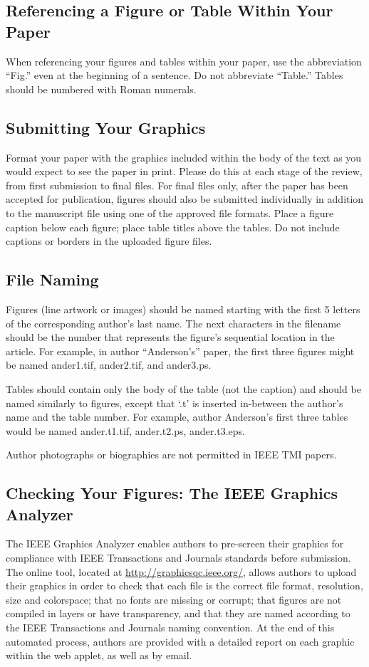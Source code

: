 \documentclass[journal,twoside,web]{ieeecolor}
\begin{document}
\subsection{Referencing a Figure or Table Within Your Paper}
When referencing your figures and tables within your paper, use the
abbreviation ``Fig.'' even at the beginning of a sentence. Do not abbreviate
``Table.'' Tables should be numbered with Roman numerals.

\subsection{Submitting Your Graphics}
Format your paper with the graphics included within the body of the text
as you would expect to see the paper in print. Please do this at each stage of the review,
from first submission to final files. For final files only, after the paper has been accepted
for publication, figures should also be submitted individually in addition to the manuscript
file using one of the approved file formats. Place a figure caption below each figure;
place table titles above the tables. Do not include captions or borders in the uploaded figure files.

\subsection{File Naming}
Figures (line artwork or images) should be named starting with the
first 5 letters of the corresponding author's last name. The next characters in the
filename should be the number that represents the figure's sequential
location in the article. For example, in author ``Anderson's'' paper,
the first three figures might be named ander1.tif, ander2.tif, and ander3.ps.

Tables should contain only the body of the table (not the caption) and
should be named similarly to figures, except that `.t' is inserted
in-between the author's name and the table number. For example, author
Anderson's first three tables would be named ander.t1.tif, ander.t2.ps, ander.t3.eps.

Author photographs or biographies are not permitted in IEEE TMI papers.

\subsection{Checking Your Figures: The IEEE Graphics Analyzer}
The IEEE Graphics Analyzer enables authors to pre-screen their graphics for
compliance with IEEE Transactions and Journals standards before submission.
The online tool, located at \underline{http://graphicsqc.ieee.org/},
allows authors to upload their graphics in order to check that each file is the correct file format,
resolution, size and colorspace; that no fonts are missing or corrupt;
that figures are not compiled in layers or have transparency,
and that they are named according to the IEEE Transactions and Journals naming convention.
At the end of this automated process, authors are provided with
a detailed report on each graphic within the web applet, as well as by email.
\end{document}
